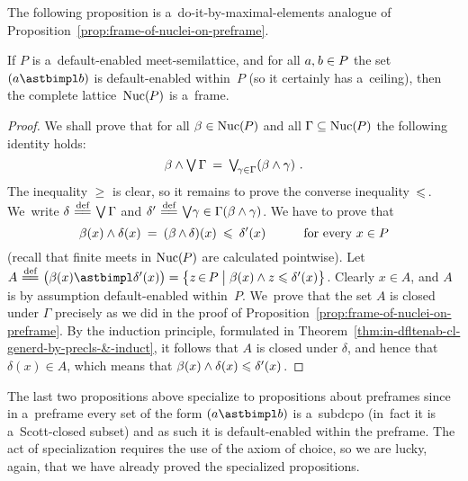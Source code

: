 \documentclass[11pt,letterpaper]{article}
\renewcommand{\thmskip}{\bigskip}
\renewcommand{\interskip}{\medskip}
\begin{document}
\thmskip

The following proposition is a~do-it-by-maximal-elements analogue
	of Proposition~\ref{prop:frame-of-nuclei-on-preframe}.

\thmskip

\begin{proposition}\label{prop:when-Nuc(meet-semilatt)-is-a-frame}
If\/ $P$ is a~default-enabled meet-semilattice,
and for all\/ $a,\mspace{1mu} b\in P$
	the set\/~$(a\astbimpl b)$ is default-enabled within~$P$
		{\rm(}so it certainly has a~ceiling\/{\rm)},
then the complete lattice\/~$\mathop{\smash{\mathrm{Nuc}}}\nolimits(\mspace{-1mu} P)$ is a~frame.
\end{proposition}

\interskip

\begin{proof}
We shall prove that for all $\beta\in\mathop{\smash{\mathrm{Nuc}}}\nolimits(\mspace{-1mu} P)$ and all $\Gamma\subseteq\mathop{\smash{\mathrm{Nuc}}}\nolimits(\mspace{-1mu} P)$
the following identity holds:
%
\begin{equation*}
\beta\wedge\mathop{\textstyle\bigvee}\nolimits\Gamma \:=\: \mathop{\textstyle\bigvee}\nolimits_{\!\gamma\in\Gamma}(\beta\wedge\gamma)~.
\end{equation*}
%
The inequality $\geq$ is clear, so it remains to prove the converse inequality~$\leqslant\mspace{2mu}$.
We~write $\delta\mathrel{\overset{\text{def}}{\mspace{1mu}=\!=\mspace{1mu}}}\mathop{\textstyle\bigvee}\nolimits\Gamma$
	and $\delta'\mathrel{\overset{\text{def}}{\mspace{1mu}=\!=\mspace{1mu}}}\mathop{\textstyle\bigvee}\nolimits{\!\gamma\in\Gamma}(\beta\wedge\gamma)\mspace{1mu}$.
We have to prove that
%
\begin{equation*}
\beta(x)\wedge\delta(x) \:=\: (\beta\mspace{-1mu}\wedge\mspace{-1mu}\delta)(x) \:\leqslant\: \delta'(x)
	\qquad\quad \text{for every $x\in P$}
\end{equation*}
%
(recall that finite meets in $\mathop{\smash{\mathrm{Nuc}}}\nolimits(\mspace{-1mu} P)$ are calculated pointwise).
Let $A \defeq \bigl(\beta(x)\astbimpl\deltapr(x)\bigr)
	= \bigset{z\narrdt\in P\bigsuchthat \beta(x)\meet z\leq\deltapr(x)}\tinysp$.
Clearly $x\in A$, and $A$ is by assumption default-enabled within~$P$.
We~prove that the set $A$ is closed under $\Gamma$
precisely as we did in the proof of Proposition~\ref{prop:frame-of-nuclei-on-preframe}.
By the induction principle,
	formulated in Theorem~\ref{thm:in-dfltenab-cl-generd-by-precls-&-induct},
it follows that $A$ is closed under $\delta$, and hence that $\delta(x)\in A$,
which means that $\beta(x)\wedge\delta(x)\leqslant\delta'(x)\mspace{1mu}$.
\end{proof}

\thmskip

The last two propositions above specialize to propositions about preframes
since in a~preframe every set of the form $(a\astbimpl b)$ is a~subdcpo
	(in~fact it is a~Scott-closed subset)
and as such it is default-enabled within the preframe.
The act of specialization requires the use of the axiom of choice,
so we are lucky, again, that we have already proved the specialized propositions.
\end{document}
